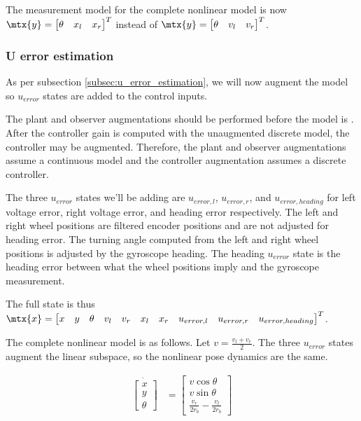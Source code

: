 The measurement model for the complete nonlinear model is now
$\mtx{y} = \begin{bmatrix}\theta & x_l & x_r\end{bmatrix}^T$ instead of
$\mtx{y} = \begin{bmatrix}\theta & v_l & v_r\end{bmatrix}^T$.

\subsubsection{U error estimation}

As per subsection \ref{subsec:u_error_estimation}, we will now augment the
\gls{model} so $u_{error}$ states are added to the \glspl{control input}.

The \gls{plant} and \gls{observer} augmentations should be performed before the
\gls{model} is . After the \gls{controller}
gain is computed with the unaugmented discrete \gls{model}, the controller may
be augmented. Therefore, the \gls{plant} and \gls{observer} augmentations assume
a continuous \gls{model} and the \gls{controller} augmentation assumes a
discrete \gls{controller}.

The three $u_{error}$ states we'll be adding are $u_{error,l}$, $u_{error,r}$,
and $u_{error,heading}$ for left voltage error, right voltage error, and heading
error respectively. The left and right wheel positions are filtered encoder
positions and are not adjusted for heading error. The turning angle computed
from the left and right wheel positions is adjusted by the gyroscope heading.
The heading $u_{error}$ state is the heading error between what the wheel
positions imply and the gyroscope measurement.

The full state is thus
$\mtx{x} = \begin{bmatrix}x & y & \theta & v_l & v_r & x_l & x_r & u_{error,l} &
  u_{error,r} & u_{error,heading}\end{bmatrix}^T$.

The complete nonlinear model is as follows. Let $v = \frac{v_l + v_r}{2}$. The
three $u_{error}$ states augment the linear subspace, so the nonlinear pose
dynamics are the same.

\begin{align}
  \dot{\begin{bmatrix}
    x \\
    y \\
    \theta
  \end{bmatrix}} &=
    \begin{bmatrix}
      v\cos\theta \\
      v\sin\theta \\
      \frac{v_r}{2r_b} - \frac{v_l}{2r_b}
    \end{bmatrix}
\end{align}

